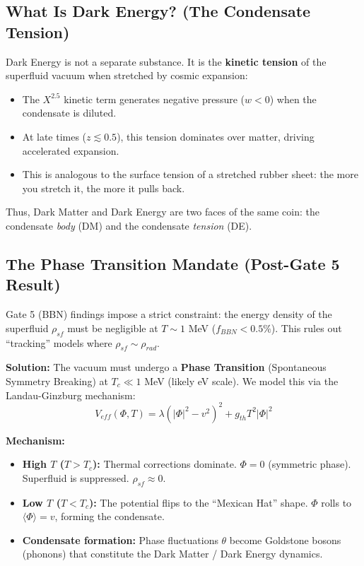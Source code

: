 \documentclass[a4paper,12pt]{article}
\begin{document}
\subsection{What Is Dark Energy? (The Condensate Tension)}
Dark Energy is not a separate substance. It is the \textbf{kinetic tension} of the superfluid vacuum when stretched by cosmic expansion:
\begin{itemize}
    \item The $X^{2.5}$ kinetic term generates negative pressure ($w < 0$) when the condensate is diluted.
    \item At late times ($z \lesssim 0.5$), this tension dominates over matter, driving accelerated expansion.
    \item This is analogous to the surface tension of a stretched rubber sheet: the more you stretch it, the more it pulls back.
\end{itemize}
Thus, Dark Matter and Dark Energy are two faces of the same coin: the condensate \textit{body} (DM) and the condensate \textit{tension} (DE).

\subsection{The Phase Transition Mandate (Post-Gate 5 Result)}
Gate 5 (BBN) findings impose a strict constraint: the energy density of the superfluid $\rho_{sf}$ must be negligible at $T \sim 1$ MeV ($f_{BBN} < 0.5\%$). This rules out ``tracking'' models where $\rho_{sf} \sim \rho_{rad}$.

\textbf{Solution:} The vacuum must undergo a \textbf{Phase Transition} (Spontaneous Symmetry Breaking) at $T_c \ll 1$ MeV (likely eV scale). We model this via the Landau-Ginzburg mechanism:
\begin{equation}
    V_{eff}(\Phi, T) = \lambda(|\Phi|^2 - v^2)^2 + g_{th} T^2 |\Phi|^2
\end{equation}

\textbf{Mechanism:}
\begin{itemize}
    \item \textbf{High $T$ ($T > T_c$):} Thermal corrections dominate. $\Phi = 0$ (symmetric phase). Superfluid is suppressed. $\rho_{sf} \approx 0$.
    \item \textbf{Low $T$ ($T < T_c$):} The potential flips to the ``Mexican Hat'' shape. $\Phi$ rolls to $\langle \Phi \rangle = v$, forming the condensate.
    \item \textbf{Condensate formation:} Phase fluctuations $\theta$ become Goldstone bosons (phonons) that constitute the Dark Matter / Dark Energy dynamics.
\end{itemize}
\end{document}
